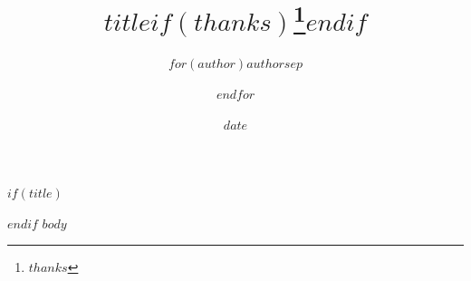 \documentclass[$if(fontsize)$$fontsize$,$endif$$if(lang)$$babel-lang$,$endif$$if(papersize)$$papersize$paper,$endif$$for(classoption)$$classoption$$sep$,$endfor$]{$documentclass$}
\title{$title$$if(thanks)$\thanks{$thanks$}$endif$}
\author{$for(author)$$author$$sep$ \and $endfor$}
\date{$date$}
\begin{document}
$if(title)$\maketitle$endif$
$body$
\end{document}
